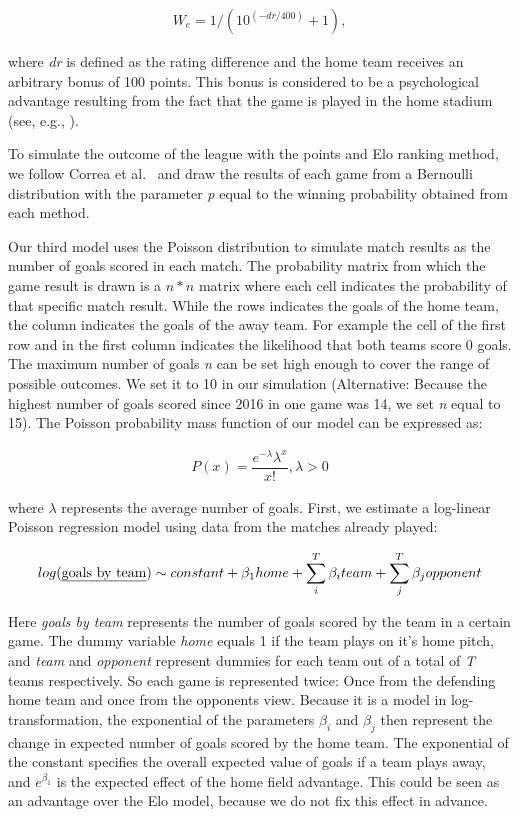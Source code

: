 \documentclass[12pt,a4paper]{article}
\begin{document}
\begin{align}
W_e = 1/(10^{(-dr/400)}+1),
\end{align}

where \emph{dr} is defined as the rating difference and the home team
receives an arbitrary bonus of 100 points. This bonus is considered to
be a psychological advantage resulting from the fact that the game is
played in the home stadium (see, e.g., \textcite{Pollard2008}).

To simulate the outcome of the league with the points and Elo ranking
method, we follow Correa et al.~\autocite*{correa} and draw the results
of each game from a Bernoulli distribution with the parameter \emph{p}
equal to the winning probability obtained from each method.

Our third model uses the Poisson distribution to simulate match results
as the number of goals scored in each match. The probability matrix from
which the game result is drawn is a \(n * n\) matrix where each cell
indicates the probability of that specific match result. While the rows
indicates the goals of the home team, the column indicates the goals of
the away team. For example the cell of the first row and in the first
column indicates the likelihood that both teams score \(0\) goals. The
maximum number of goals \emph{n} can be set high enough to cover the
range of possible outcomes. We set it to 10 in our simulation
(Alternative: Because the highest number of goals scored since 2016 in
one game was 14, we set \emph{n} equal to 15). The Poisson probability
mass function of our model can be expressed as:

\begin{align}
P(x) = \dfrac{e^{-\lambda}\lambda^x}{x!}, \lambda > 0
\end{align}

where \(\lambda\) represents the average number of goals. First, we
estimate a log-linear Poisson regression model using data from the
matches already played:

\begin{align}
log(\text{\emph{goals by team}}) \sim constant + \beta_1 home + \sum_{i}^{T} \beta_i team + \sum_{j}^{T} \beta_j opponent
\end{align}

Here \emph{goals by team} represents the number of goals scored by the
team in a certain game. The dummy variable \emph{home} equals 1 if the
team plays on it's home pitch, and \emph{team} and \emph{opponent}
represent dummies for each team out of a total of \emph{T} teams
respectively. So each game is represented twice: Once from the defending
home team and once from the opponents view. Because it is a model in
log-transformation, the exponential of the parameters \(\beta_i\) and
\(\beta_j\) then represent the change in expected number of goals scored
by the home team. The exponential of the constant specifies the overall
expected value of goals if a team plays away, and \(e^{\beta_1}\) is the
expected effect of the home field advantage. This could be seen as an
advantage over the Elo model, because we do not fix this effect in
advance.
\end{document}
